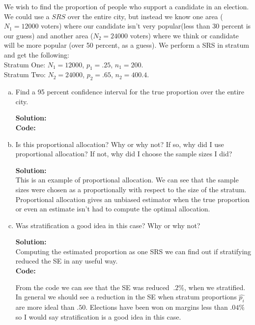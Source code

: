 \documentclass[12pt]{article}
\makeatletter
\theoremstyle{homework}
\newenvironment{exercise}[1]
{\def\@currentlabel{#1}\exercisecore}
{\endexercisecore}
\newcommand{\localhead}[1]{\par\smallskip\noindent\textbf{#1}\nobreak\\}%
\newcommand\solution{\localhead{Solution:}}
\makeatother
\begin{document}
\begin{exercise}{3} We wish to find the proportion of people who support a candidate in an election.
    We could use a $SRS$ over the entire city, but instead we know one area ($N_1 = 12000$ voters) where
    our candidate isn't very popular(less than 30 percent is our guess) and another area ($N_2 = 24000$ voters)
    where we think or candidate will be more popular (over 50 percent, as a guess). We perform a SRS
    in stratum and get the following:\\
    Stratum One: $N_1 = 12000$, $p_1 = .25$, $n_1 = 200$. \\
    Stratum Two: $N_2 = 24000$, $p_2 = .65$, $n_2 = 400.4$.\\
    \begin{enumerate}[a.]
        \item Find a 95 percent confidence interval for the true proportion over the entire city.\\
        \solution 
        \textbf{Code:}
        \begin{center}
            
        \end{center}
        \vspace{.15in}

        \item Is this proportional allocation? Why or why not? If so, why did I use proportional allocation?
        If not, why did I choose the sample sizes I did?\\
        \solution This is an example of proportional allocation. We can see that the sample sizes were chosen
        as a proportionally with respect to the size of the stratum. Proportional allocation gives an unbiased estimator 
        when the true proportion or even an estimate isn't had to compute the optimal allocation. 
        \vspace{.15in}


        \item Was stratification a good idea in this case? Why or why not?\\
        \solution Computing the estimated proportion as one SRS we can find out if stratifying reduced 
        the SE in any useful way.\\
        \textbf{Code:}
        \begin{center}
            
        \end{center}
        From the code we can see that the SE was reduced $~.2\%$, when we stratified. In general we should 
        see a reduction in the SE when stratum proportions $\hat{p_i}$ are more ideal than $.50$. Elections have been 
        won on margins less than $.04\%$ so I would say stratification is a good idea in this case. 
    \end{enumerate}
\end{exercise}
\vspace{1in}
\end{document}
